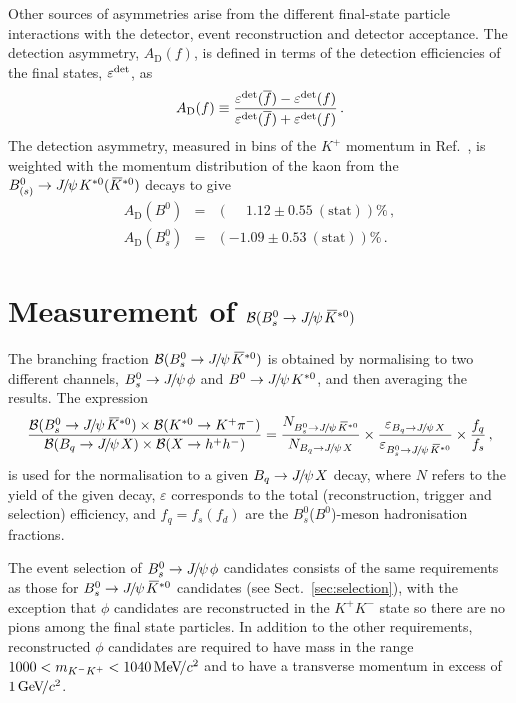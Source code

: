 \documentclass[12pt,a4paper]{article}
\def\PJ      {\ensuremath{J}\xspace}
\def\Ppsi {\ensuremath{\psi}\xspace}
\def\jpsi     {{\ensuremath{{\PJ\mskip -3mu/\mskip -2mu\Ppsi\mskip 2mu}}}\xspace}
\newcommand{\Bs}{\ensuremath{B^0_s}\xspace}
\newcommand{\Bd}{\ensuremath{B^0}\xspace}
\newcommand{\BJpsiX}{\ensuremath{B_{q}\to \jpsi X}\xspace}
\newcommand{\BdJpsiKst}{\ensuremath{B^0\to \jpsi K^{*0}}\xspace}
\newcommand{\BsJpsiKst}{\ensuremath{B^0_s\to \jpsi \Kstarzb}\xspace}
\newcommand{\BJpsiKst}{\ensuremath{B^0_{(s)}\to \jpsi K^{*0}(\Kstarzb)}\xspace}
\newcommand{\BsJpsiPhi}{\ensuremath{B^0_s\to \jpsi \phi}\xspace}
\def\Kbar  {\kern 0.2em\overline{\kern -0.2em K}{}\xspace}
\def\Kstarzb {\ensuremath{\Kbar^{*0}}\xspace}
\newcommand{\BRof}[1]{\ensuremath{{\cal B}(#1)}\xspace}
\newcommand{\gevcc}{\ensuremath{{\mathrm{\,Ge\kern -0.1em V\!/}c^2}}\xspace}
\newcommand{\mevcc}{\ensuremath{{\mathrm{\,Me\kern -0.1em V\!/}c^2}}\xspace}
\newcommand{\Km}{\ensuremath{K^-}\xspace}
\newcommand{\Kp}{\ensuremath{K^+}\xspace}
\newcommand{\secref}[1]{Sect.~\ref{#1}}
\begin{document}
Other sources of asymmetries arise from the
different final-state particle interactions with the detector, event reconstruction and detector acceptance.
The detection asymmetry, $A_{\text{D}}(f)$, is defined in terms of the detection efficiencies of the final states, $\varepsilon^{\rm det}$, as 
\begin{equation}\label{eq:detAsymm}
A_{\text{D}}(f) \equiv \frac{\varepsilon^{\rm det}(\overline{f}) - \varepsilon^{\rm det}(f)}{\varepsilon^{\rm det}(\overline{f}) + \varepsilon^{\rm det}(f)} \,.
\end{equation}
The detection asymmetry, measured in bins of the \Kp momentum in Ref.~\cite{LHCB-PAPER-2014-013}, is weighted with the momentum distribution of the kaon from the \BJpsiKst decays to give
\begin{eqnarray}
A_{\text{D}}(\Bd) & = & \left(\phantom{-}1.12  \pm 0.55 \:(\text{stat}) \right)\% \,,\nonumber \\ 
A_{\text{D}}(\Bs) & = & \left({-}1.09 \pm 0.53 \:(\text{stat}) \right)\% \,. \nonumber
\end{eqnarray}



\section{Measurement of \BRof\BsJpsiKst}\label{sec:normalisation}

The branching fraction \BRof\BsJpsiKst is obtained by normalising to two different channels, \BsJpsiPhi and \BdJpsiKst, and then averaging the results.
The expression
\begin{multline}
\frac{\BRof\BsJpsiKst\times\BRof{\Kst\to K^+\pi^-}}{\BRof\BJpsiX\times\BRof{X \to h^+h^-}} = 
\frac{N_{\BsJpsiKst}}{N_{\BJpsiX}}\times\frac{\varepsilon_{\BJpsiX}}{\varepsilon_{\BsJpsiKst}}\times\frac{f_q}{f_s}\,,
\end{multline}
is used for the normalisation to a given \BJpsiX decay, 
where $N$ refers to the yield of the given decay, $\varepsilon$ corresponds to the 
total (reconstruction, trigger and selection) efficiency, and  $f_q =f_s(f_d)$ are the $B_s^0$(\Bd)-meson hadronisation fractions. 

The event selection of \BsJpsiPhi candidates consists of the same requirements as those for \BsJpsiKst candidates (see \secref{sec:selection}), with the exception that $\phi$ candidates are reconstructed in the $\Kp\Km$ state so there are no pions among the final state particles.
In addition to the other requirements, reconstructed $\phi$ candidates are required to have mass in the range $1000 < m_{K^-K^+} < 1040 \mevcc$ and to have a transverse momentum in excess of $1\gevcc$.
\end{document}
